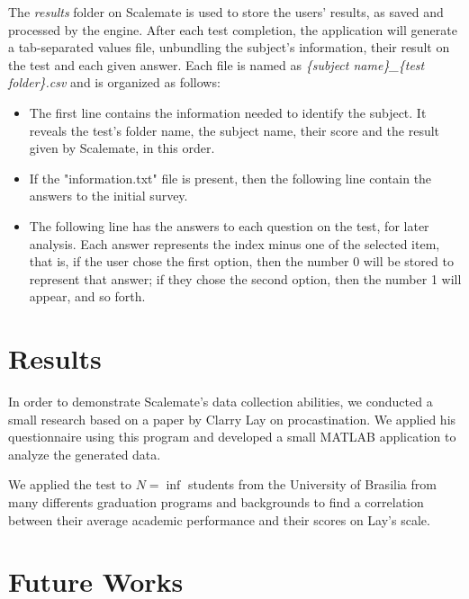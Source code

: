 \documentclass[12pt, a4paper, twoside]{article}
\begin{document}
The \textit{results} folder on Scalemate is used to store the users' results, as saved and processed by the engine. After each test completion, the application will generate a tab-separated values file, unbundling the subject's information, their result on the test and each given answer. Each file is named as \textit{\{subject name\}\_\{test folder\}.csv} and is organized as follows:

\begin{itemize}
\item The first line contains the information needed to identify the subject. It reveals the test's folder name, the subject name, their score and the result given by Scalemate, in this order.
\item If the "information.txt" file is present, then the following line contain the answers to the initial survey.
\item The following line has the answers to each question on the test, for later analysis. Each answer represents the index minus one of the selected item, that is, if the user chose the first option, then the number 0 will be stored to represent that answer; if they chose the second option, then the number 1 will appear, and so forth.
\end{itemize}

\section{Results}

In order to demonstrate Scalemate's data collection abilities, we conducted a small research based on a paper by Clarry Lay \cite{lay86} on procastination. We applied his questionnaire using this program and developed a small MATLAB application to analyze the generated data.

We applied the test to $N = \inf$ students from the University of Brasilia from many differents graduation programs and backgrounds to find a correlation between their average academic performance and their scores on Lay's scale.




\section{Future Works}
\end{document}
